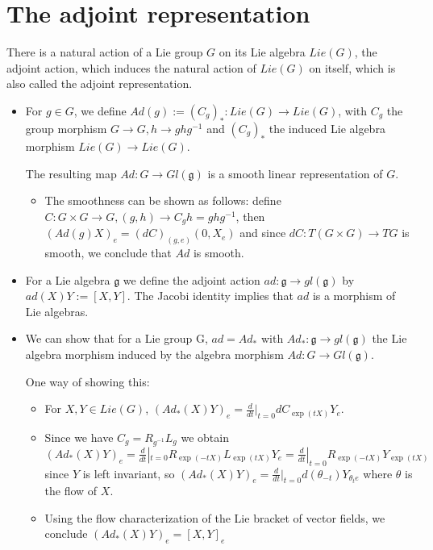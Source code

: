 \documentclass{report}
\theoremstyle{definition}
\begin{document}
\section{The adjoint representation}

There is a natural action of a Lie group $G$ on its Lie algebra $Lie(G)$, the adjoint action, which induces the natural action of $Lie(G)$ on itself, which is also called the adjoint representation.

\begin{itemize}
    \item For $g\in G$, we define $Ad(g):=(C_g)_*:Lie(G)\to Lie(G)$, with $C_g$ the group morphism $G\to G,h\to ghg^{-1}$ and $(C_g)_*$ the induced Lie algebra morphism $Lie(G)\to Lie(G)$.

    The resulting map $Ad:G\to Gl(\mathfrak{g})$ is a smooth linear representation of $G$.
    \begin{itemize}
        \item The smoothness can be shown as follows: define $C:G\times G\to G, (g,h)\to C_gh=ghg^{-1}$, then $(Ad(g)X)_e=(dC)_{(g,e)}(0,X_e)$ and since $dC:T(G\times G)\to TG$ is smooth, we conclude that $Ad$ is smooth.
    \end{itemize}
    \item For a Lie algebra $\mathfrak{g}$ we define the adjoint action $ad:\mathfrak{g}\to gl(\mathfrak{g})$ by $ad(X)Y:=[X,Y]$. The Jacobi identity implies that $ad$ is a morphism of Lie algebras.
    \item We can show that for a Lie group G, $ad=Ad_*$ with $Ad_*:\mathfrak{g}\to gl(\mathfrak{g})$ the Lie algebra morphism induced by the algebra morphism $Ad:G\to Gl(\mathfrak{g})$.

    One way of showing this:
    \begin{itemize}
        \item For $X,Y\in Lie(G)$, $(Ad_*(X)Y)_e=\frac{d}{dt}|_{t=0}dC_{\exp(tX)}Y_e$.
        \item Since we have $C_g=R_{g^{-1}}L_g$ we obtain $(Ad_*(X)Y)_e=\frac{d}{dt}|_{t=0}R_{\exp(-tX)}L_{\exp(tX)}Y_e=\frac{d}{dt}|_{t=0}R_{\exp(-tX)}Y_{\exp(tX)}$ since $Y$ is left invariant, so $(Ad_*(X)Y)_e=\frac{d}{dt}|_{t=0}d(\theta_{-t})Y_{\theta_te}$ where $\theta$ is the flow of $X$.
        \item Using the flow characterization of the Lie bracket of vector fields, we conclude $(Ad_*(X)Y)_e=[X,Y]_e$
    \end{itemize}
\end{itemize}
\end{document}
